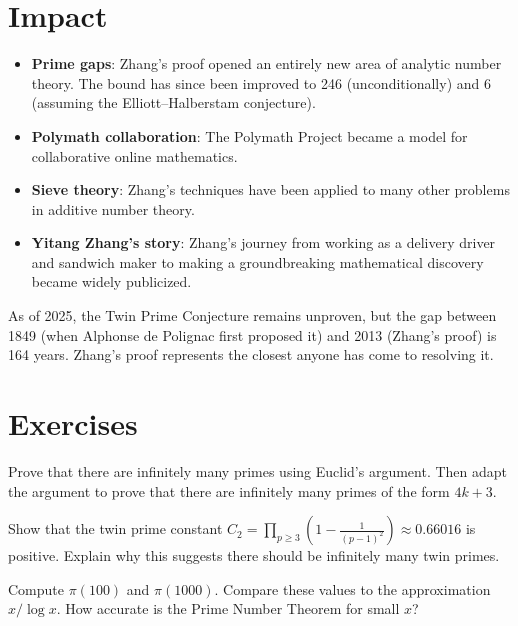 \section{Impact}

\begin{itemize}
\item \textbf{Prime gaps}: Zhang's proof opened an entirely new area of analytic number theory. The bound has since been improved to 246 (unconditionally) and 6 (assuming the Elliott--Halberstam conjecture).
\item \textbf{Polymath collaboration}: The Polymath Project became a model for collaborative online mathematics.
\item \textbf{Sieve theory}: Zhang's techniques have been applied to many other problems in additive number theory.
\item \textbf{Yitang Zhang's story}: Zhang's journey from working as a delivery driver and sandwich maker to making a groundbreaking mathematical discovery became widely publicized.
\end{itemize}

\begin{highlightbox}
As of 2025, the Twin Prime Conjecture remains unproven, but the gap between 1849 (when Alphonse de Polignac first proposed it) and 2013 (Zhang's proof) is 164 years. Zhang's proof represents the closest anyone has come to resolving it.
\end{highlightbox}

\section{Exercises}

\begin{exercise}[Basic]
Prove that there are infinitely many primes using Euclid's argument. Then adapt the argument to prove that there are infinitely many primes of the form $4k + 3$.
\end{exercise}

\begin{exercise}[Intermediate]
Show that the twin prime constant $C_2 = \prod_{p \geq 3} \left(1 - \frac{1}{(p-1)^2}\right) \approx 0.66016$ is positive. Explain why this suggests there should be infinitely many twin primes.
\end{exercise}

\begin{exercise}[Challenge]
Compute $\pi(100)$ and $\pi(1000)$. Compare these values to the approximation $x/\log x$. How accurate is the Prime Number Theorem for small $x$?
\end{exercise}

